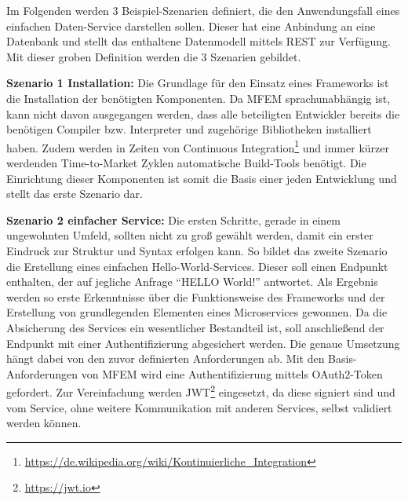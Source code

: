 
Im Folgenden werden 3 Beispiel-Szenarien definiert, die den Anwendungsfall eines einfachen Daten-Service darstellen sollen. Dieser hat eine Anbindung an eine Datenbank und stellt das enthaltene Datenmodell mittels \ac{REST} zur Verfügung. Mit dieser groben Definition werden die 3 Szenarien gebildet.

\textbf{Szenario 1 Installation:} Die Grundlage für den Einsatz eines Frameworks ist die Installation der benötigten Komponenten. Da \ac{MFEM} sprachunabhängig ist, kann nicht davon ausgegangen werden, dass alle beteiligten Entwickler bereits die benötigen Compiler bzw. Interpreter und zugehörige Bibliotheken installiert haben. Zudem werden in Zeiten von Continuous Integration\footnote{\url{https://de.wikipedia.org/wiki/Kontinuierliche_Integration}} und immer kürzer werdenden Time-to-Market Zyklen automatische Build-Tools benötigt. Die Einrichtung dieser Komponenten ist somit die Basis einer jeden Entwicklung und stellt das erste Szenario dar.


\textbf{Szenario 2 einfacher Service:} Die ersten Schritte, gerade in einem ungewohnten Umfeld, sollten nicht zu groß gewählt werden, damit ein erster Eindruck zur Struktur und Syntax erfolgen kann. So bildet das zweite Szenario die Erstellung eines einfachen Hello-World-Services. Dieser soll einen Endpunkt enthalten, der auf jegliche Anfrage \enquote{HELLO World!} antwortet. Als Ergebnis werden so erste Erkenntnisse über die Funktionsweise des Frameworks und der Erstellung von grundlegenden Elementen eines Microservices gewonnen. Da die Absicherung des Services ein wesentlicher Bestandteil ist, soll anschließend der Endpunkt mit einer Authentifizierung abgesichert werden. Die genaue Umsetzung hängt dabei von den zuvor definierten Anforderungen ab. 
Mit den Basis-Anforderungen von \ac{MFEM} wird eine Authentifizierung mittels OAuth2-Token gefordert. Zur Vereinfachung werden \ac{JWT}\footnote{\url{https://jwt.io}} eingesetzt, da diese signiert sind und vom Service, ohne weitere Kommunikation mit anderen Services, selbst validiert werden können.   


